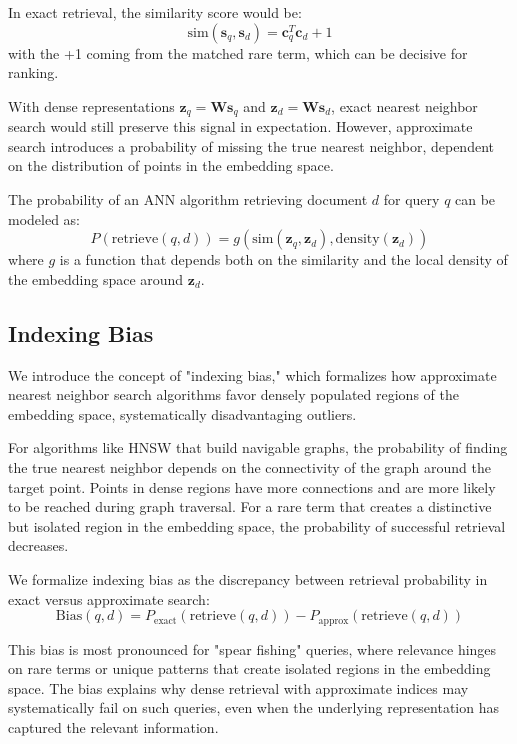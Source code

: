 \documentclass[sigconf,review]{acmart}
\begin{document}
In exact retrieval, the similarity score would be:
\begin{equation}
\text{sim}(\mathbf{s}_q, \mathbf{s}_d) = \mathbf{c}_q^T\mathbf{c}_d + 1
\end{equation}
with the +1 coming from the matched rare term, which can be decisive for ranking.

With dense representations $\mathbf{z}_q = \mathbf{W}\mathbf{s}_q$ and $\mathbf{z}_d = \mathbf{W}\mathbf{s}_d$, exact nearest neighbor search would still preserve this signal in expectation. However, approximate search introduces a probability of missing the true nearest neighbor, dependent on the distribution of points in the embedding space.

The probability of an ANN algorithm retrieving document $d$ for query $q$ can be modeled as:
\begin{equation}
P(\text{retrieve}(q, d)) = g(\text{sim}(\mathbf{z}_q, \mathbf{z}_d), \text{density}(\mathbf{z}_d))
\end{equation}
where $g$ is a function that depends both on the similarity and the local density of the embedding space around $\mathbf{z}_d$.

\subsection{Indexing Bias}
We introduce the concept of "indexing bias," which formalizes how approximate nearest neighbor search algorithms favor densely populated regions of the embedding space, systematically disadvantaging outliers. 

For algorithms like HNSW that build navigable graphs, the probability of finding the true nearest neighbor depends on the connectivity of the graph around the target point. Points in dense regions have more connections and are more likely to be reached during graph traversal. For a rare term that creates a distinctive but isolated region in the embedding space, the probability of successful retrieval decreases.

We formalize indexing bias as the discrepancy between retrieval probability in exact versus approximate search:
\begin{equation}
\text{Bias}(q, d) = P_{\text{exact}}(\text{retrieve}(q, d)) - P_{\text{approx}}(\text{retrieve}(q, d))
\end{equation}

This bias is most pronounced for "spear fishing" queries, where relevance hinges on rare terms or unique patterns that create isolated regions in the embedding space. The bias explains why dense retrieval with approximate indices may systematically fail on such queries, even when the underlying representation has captured the relevant information.
\end{document}
